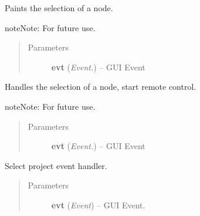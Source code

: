 \documentclass[letterpaper,10pt,english]{sphinxmanual}
\begin{document}
\begin{fulllineitems}
\begin{fulllineitems}
\label{api:wos.GUI.PaintSelect}
Paints the selection of a node.

\begin{notice}{note}{Note:}
For future use.
\end{notice}
\begin{quote}\begin{description}
\item[{Parameters}] \leavevmode
\textbf{evt} (\emph{Event.}) -- GUI Event

\end{description}\end{quote}

\end{fulllineitems}


\begin{fulllineitems}
\label{api:wos.GUI.SelectNode}
Handles the selection of a node, start remote control.

\begin{notice}{note}{Note:}
For future use.
\end{notice}
\begin{quote}\begin{description}
\item[{Parameters}] \leavevmode
\textbf{evt} (\emph{Event.}) -- GUI Event

\end{description}\end{quote}

\end{fulllineitems}


\begin{fulllineitems}
\label{api:wos.GUI.SelectProjectDialog}
Select project event handler.
\begin{quote}\begin{description}
\item[{Parameters}] \leavevmode
\textbf{evt} (\emph{Event}) -- GUI Event.

\end{description}\end{quote}


\end{fulllineitems}
\end{fulllineitems}
\end{document}
